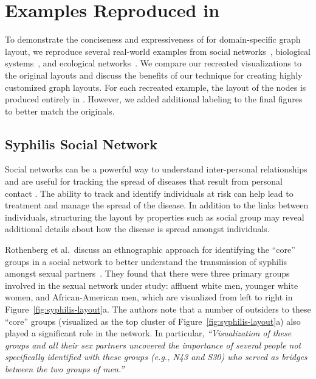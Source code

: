 \section{Examples Reproduced in \projectname}
\label{sec:examples}

To demonstrate the conciseness and expressiveness of \projectname for domain-specific
graph layout, we reproduce several real-world examples from social 
networks~\cite{rothenberg1998using}, biological systems~\cite{barsky2008cerebral}, 
and ecological networks~\cite{kruger2017,baskerville2011spatial}. 
We compare our recreated visualizations to the original layouts and 
discuss the benefits of our technique for creating highly customized graph layouts.
For each recreated example, the layout of the nodes is produced
entirely in \projectname. However, we added additional labeling to the 
final figures to better match the originals.


\subsection{Syphilis Social Network}
\syphilisLayout
\syphilisSpec

Social networks can be a powerful way to understand inter-personal
relationships and are useful for tracking the spread of diseases that
result from personal contact \cite{rothenberg1998using,fitzpatrick2001preventable,mcelroy2003network,fu2011hiv}.
The ability to track and identify individuals at risk can help
lead to treatment and manage the spread of the disease. In
addition to the links between individuals, structuring the layout by
properties such as social group may reveal additional details about
how the disease is spread amongst individuals.

Rothenberg et al.\ discuss an ethnographic approach for identifying the
``core'' groups in a social network to better understand the transmission
of syphilis amongst sexual partners~\cite{rothenberg1998using}. They found
that there were three primary groups involved in the sexual network under study:
affluent white men, younger white women, and African-American men, 
which are visualized from left to right in Figure~\ref{fig:syphilis-layout}a. 
The authors note that a number of outsiders to these ``core'' groups
(visualized as the top cluster of Figure~\ref{fig:syphilis-layout}a) 
also played a significant role in the network. In
particular, \emph{``Visualization of these groups and all their sex
  partners uncovered the importance of several people not specifically
  identified with these groups (e.g., N43 and S30) who served as bridges
  between the two groups of men.''}

